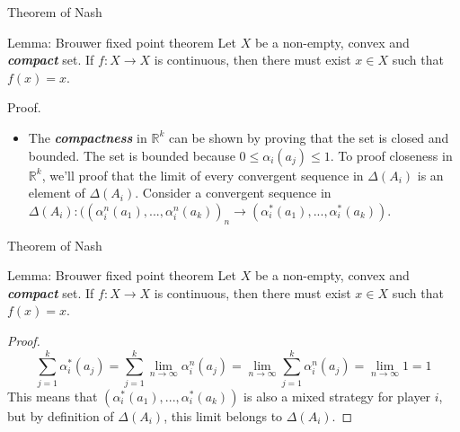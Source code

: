 \documentclass{beamer}
\newcommand{\R}{\mathbb{R}}
\begin{document}
\begin{frame}{Theorem of Nash}
\begin{block}{Lemma: Brouwer fixed point theorem}
Let $X$ be a non-empty, convex and \textbf{\emph{compact}} set. If $f : X \rightarrow X$ is continuous, then there must exist $x \in X$ such that $f(x) = x$.
\end{block}
\begin{block}{Proof.}
\begin{itemize}
         \item  The \textbf{\emph{compactness}} in $\R^k$ can be shown by proving that the set is closed and bounded. The set is bounded because $0 \leq \alpha_i(a_j) \leq 1$. To proof closeness in $\R^k$, we'll proof that the limit of every convergent sequence in $\Delta(A_i)$ is an element of $\Delta(A_i)$. Consider a convergent sequence in $\Delta(A_i): ((\alpha^n_i(a_1),...,\alpha^n_i(a_k))_n\rightarrow(\alpha^*_i(a_1),...,\alpha^*_i(a_k))$. 
           
      \end{itemize}
\end{block}
\end{frame}

\begin{frame}{Theorem of Nash}

\begin{block}{Lemma: Brouwer fixed point theorem}
Let $X$ be a non-empty, convex and \emph{\textbf{compact}} set. If $f : X \rightarrow X$ is continuous, then there must exist $x \in X$ such that $f(x) = x$.
\end{block}
\begin{proof}
         $$\sum_{j=1}^k{\alpha^*_i(a_j)}  = \displaystyle\sum_{j=1}^k{\lim_{n\rightarrow\infty}{\alpha^n_i(a_j)}} = \displaystyle\lim_{n\rightarrow\infty}{\sum_{j=1}^k\alpha^n_i(a_j)} = \displaystyle\lim_{n\rightarrow\infty}{1} = 1$$
                        This means that $(\alpha^*_i(a_1),...,\alpha^*_i(a_k))$ is also a mixed strategy for player $i$, but by definition of $\Delta(A_i)$, this limit belongs to $\Delta(A_i)$.
\end{proof}
\end{frame}
\end{document}
